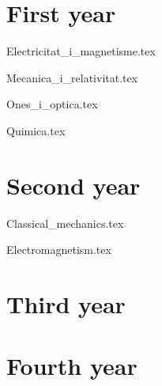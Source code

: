 \documentclass{report}
\begin{document}
    \chapter{First year}
        {Electricitat_i_magnetisme.tex}
        \cleardoublepage
        
        {Mecanica_i_relativitat.tex}
        \cleardoublepage
        
        {Ones_i_optica.tex}
        \cleardoublepage
        
        {Quimica.tex}
        \cleardoublepage
    \chapter{Second year}
        {Classical_mechanics.tex}
        \cleardoublepage
        
        {Electromagnetism.tex}
        \cleardoublepage
    \chapter{Third year}
    \chapter{Fourth year}
\end{document}
